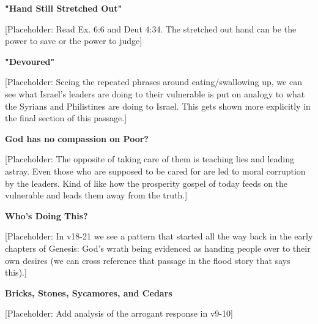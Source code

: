 \documentclass[11pt]{article}
\begin{document}
\vspace{3em}
{\large\bfseries "Hand Still Stretched Out"}
\vspace{1em}

[Placeholder: Read Ex. 6:6 and Deut 4:34. The stretched out hand can be the power to save or the power to judge]

\vspace{3em}
{\large\bfseries "Devoured"}
\vspace{1em}

[Placeholder: Seeing the repeated phrases around eating/swallowing up, we can see what Israel's leaders are doing to their vulnerable is put on analogy to what the Syrians and Philistines are doing to Israel. This gets shown more explicitly in the final section of this passage.]

\vspace{3em}
{\large\bfseries God has no compassion on Poor?}
\vspace{1em}

[Placeholder: The opposite of taking care of them is teaching lies and leading astray. Even those who are supposed to be cared for are led to moral corruption by the leaders. Kind of like how the prosperity gospel of today feeds on the vulnerable and leads them away from the truth.]

\vspace{3em}
{\large\bfseries Who's Doing This?}
\vspace{1em}

[Placeholder: In v18-21 we see a pattern that started all the way back in the early chapters of Genesis: God's wrath being evidenced as handing people over to their own desires (we can cross reference that passage in the flood story that says this).]

\vspace{3em}
{\large\bfseries Bricks, Stones, Sycamores, and Cedars}
\vspace{1em}

[Placeholder: Add analysis of the arrogant response in v9-10]
\end{document}

